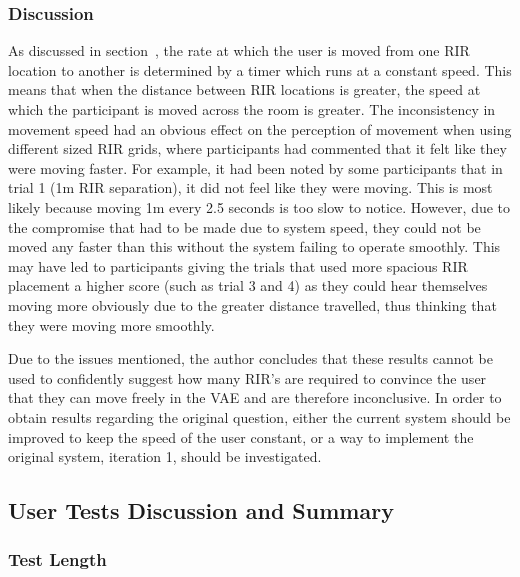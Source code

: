 \documentclass[../../main.tex]{subfiles}
\begin{document}
			\subsubsection{Discussion}

			As discussed in section~, the rate at which the user is moved from one \ac{RIR} location to another is determined by a timer which runs at a constant speed. This means that when the distance between \ac{RIR} locations is greater, the speed at which the participant is moved across the room is greater. The inconsistency in movement speed had an obvious effect on the perception of movement when using different sized \ac{RIR} grids, where participants had commented that it felt like they were moving faster. For example, it had been noted by some participants that in trial 1 (1m \ac{RIR} separation), it did not feel like they were moving. This is most likely because moving 1m every 2.5 seconds is too slow to notice. However, due to the compromise that had to be made due to system speed, they could not be moved any faster than this without the system failing to operate smoothly. This may have led to participants giving the trials that used more spacious \ac{RIR} placement a higher score (such as trial 3 and 4) as they could hear themselves moving more obviously due to the greater distance travelled, thus thinking that they were moving more smoothly.

			Due to the issues mentioned, the author concludes that these results cannot be used to confidently suggest how many \ac{RIR}'s are required to convince the user that they can move freely in the \ac{VAE} and are therefore inconclusive. In order to obtain results regarding the original question, either the current system should be improved to keep the speed of the user constant, or a way to implement the original system, iteration 1, should be investigated.

		\subsection{User Tests Discussion and Summary}

			\subsubsection{Test Length}
\end{document}
